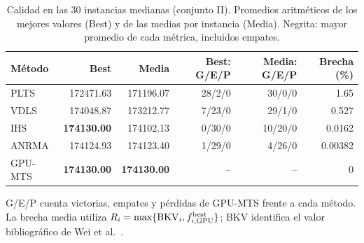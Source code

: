 \begin{table}[tbp]\centering\small
\caption{Calidad en las 30 instancias medianas (conjunto II). Promedios aritméticos de los mejores valores (Best) y de las medias por instancia (Media). Negrita: mayor promedio de cada métrica, incluidos empates.}
\label{tab:benchmark-medium}
\begin{tabular}{lrrrrr}
\toprule
Método & Best & Media & Best: G/E/P & Media: G/E/P & Brecha (\%)\\
\midrule
PLTS & 172471.63 & 171196.07 & 28/2/0 & 30/0/0 & 1.65\\
VDLS & 174048.87 & 173212.77 & 7/23/0 & 29/1/0 & 0.527\\
IHS & \textbf{174130.00} & 174102.13 & 0/30/0 & 10/20/0 & 0.0162\\
ANRMA & 174124.93 & 174123.40 & 1/29/0 & 4/26/0 & 0.00382\\
GPU-MTS & \textbf{174130.00} & \textbf{174130.00} & -- & -- & 0\\
\bottomrule\end{tabular}
\par\smallskip\parbox{.97\linewidth}{\footnotesize G/E/P cuenta victorias, empates y pérdidas de GPU-MTS frente a cada método. La brecha media utiliza $R_i=\max\{\mathrm{BKV}_i,f^{\mathrm{best}}_{i,\rm GPU}\}$; BKV identifica el valor bibliográfico de Wei et al.~\cite{Wei2026ANRMA}.}
\end{table}
